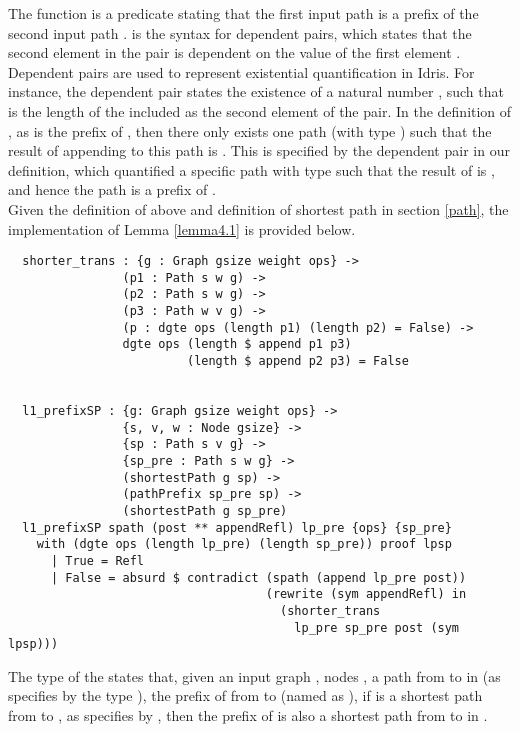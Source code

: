 The  function is a predicate stating that the first input path  is a prefix of the second input path .  is the syntax for dependent pairs, which states that the second element  in the pair is dependent on the value of the first element . Dependent pairs are used to represent existential quantification in Idris. For instance, the dependent pair  states the existence of a natural number , such that  is the length of the  included as the second element of the pair. In the definition of , as  is the prefix of , then there only exists one path (with type ) such that the result of appending  to this path is . This is specified by the dependent pair  in our definition, which quantified a specific path  with type  such that the result of  is , and hence the path  is a prefix of . 
\\

Given the definition of  above and definition of shortest path in section \ref{path}, the implementation of Lemma \ref{lemma4.1} is provided below. 
\begin{lstlisting}
  shorter_trans : {g : Graph gsize weight ops} ->
                (p1 : Path s w g) ->
                (p2 : Path s w g) ->
                (p3 : Path w v g) ->
                (p : dgte ops (length p1) (length p2) = False) ->
                dgte ops (length $ append p1 p3) 
                         (length $ append p2 p3) = False


  l1_prefixSP : {g: Graph gsize weight ops} ->
                {s, v, w : Node gsize} ->
                {sp : Path s v g} ->
                {sp_pre : Path s w g} ->
                (shortestPath g sp) ->
                (pathPrefix sp_pre sp) ->
                (shortestPath g sp_pre)
  l1_prefixSP spath (post ** appendRefl) lp_pre {ops} {sp_pre}
    with (dgte ops (length lp_pre) (length sp_pre)) proof lpsp
      | True = Refl
      | False = absurd $ contradict (spath (append lp_pre post))
                                    (rewrite (sym appendRefl) in 
                                      (shorter_trans 
                                        lp_pre sp_pre post (sym lpsp)))
\end{lstlisting}

The type of the  states that, given an input graph , nodes , a path  from  to  in  (as specifies by the type ), the prefix of  from  to  (named as ), if  is a shortest path from  to , as specifies by , then the prefix  of  is also a shortest path from  to  in . 
\\

